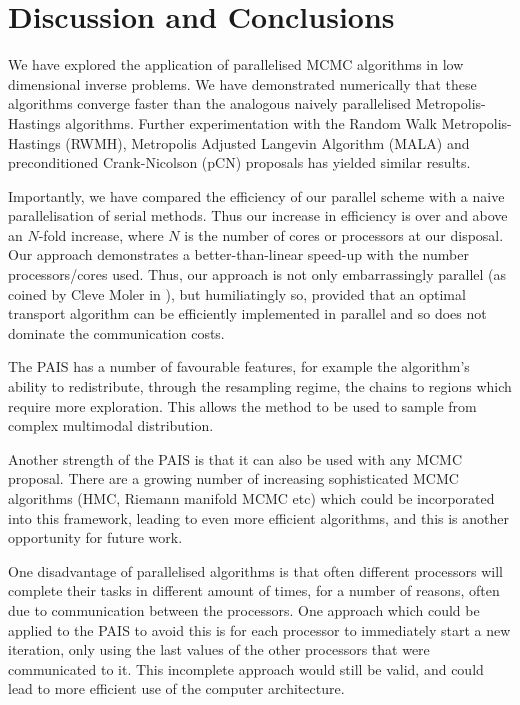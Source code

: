 \documentclass[final]{siamltex}
\begin{document}
\section{Discussion and Conclusions}\label{Sec:Conc} 

We have explored the application of parallelised MCMC algorithms in
low dimensional inverse problems. We have demonstrated numerically
that these algorithms converge faster than the analogous naively parallelised
Metropolis-Hastings algorithms. Further experimentation with the
Random Walk Metropolis-Hastings (RWMH), Metropolis Adjusted Langevin
Algorithm (MALA) and preconditioned Crank-Nicolson (pCN) proposals has
yielded similar results\cite{Paul}.

Importantly, we have compared the efficiency of our parallel scheme
with a naive parallelisation of serial methods. Thus our increase in
efficiency is over and above an $N$-fold increase, where $N$ is the
number of cores or processors at our disposal. Our approach
demonstrates a better-than-linear speed-up with the number
processors/cores used. Thus, our approach is not only embarrassingly
parallel (as coined by Cleve Moler in \cite{moler1986matrix}), but
humiliatingly so, provided that an optimal transport algorithm can be
efficiently implemented in parallel and so does not dominate the
communication costs.

The PAIS has a number of favourable features, for example the
algorithm's ability to redistribute, through the resampling regime,
the chains to regions which require more exploration. This allows the
method to be used to sample from complex multimodal distribution.

Another strength of the PAIS is that it can also be used with any MCMC
proposal. There are a growing number of increasing sophisticated MCMC
algorithms (HMC, Riemann manifold MCMC etc) which could be
incorporated into this framework, leading to even more efficient
algorithms, and this is another opportunity for future work. 

One disadvantage of parallelised algorithms is that often different
processors will complete their tasks in different amount of times, for
a number of reasons, often due to communication between the
processors. One approach which could be applied to the PAIS to avoid
this is for each processor to immediately start a new iteration, only
using the last values of the other processors that were communicated
to it. This incomplete approach would still be valid, and could lead
to more efficient use of the computer architecture.
\end{document}
